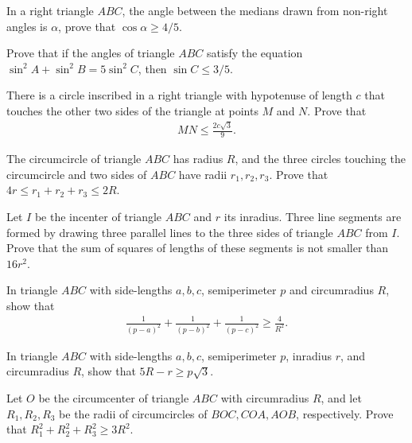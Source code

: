 \begin{question}
    In a right triangle $ABC$, the angle between the medians drawn from non-right angles is $\alpha$, prove that $\cos \alpha \geq 4/5$.
\end{question}


\begin{question}
    Prove that if the angles of triangle $ABC$ satisfy the equation $\sin^2 A + \sin^2 B = 5\sin^2 C$, then $\sin C \leq 3/5$.
\end{question}


\begin{question}
    There is a circle inscribed in a right triangle with hypotenuse of length $c$ that touches the other two sides of the triangle at points $M$ and $N$. Prove that
    \begin{align*}
        MN \leq \frac{2c\sqrt{3}}{9}.
    \end{align*}
\end{question}




\begin{question}
    The circumcircle of triangle $ABC$ has radius $R$, and the three circles touching the circumcircle and two sides of $ABC$ have radii $r_1,r_2,r_3$. Prove that $4r \leq r_1+r_2+r_3\leq 2R$.
\end{question}

\begin{question}
    Let $I$ be the incenter of triangle $ABC$ and $r$ its inradius. Three line segments are formed by drawing three parallel lines to the three sides of triangle $ABC$ from $I$. Prove that the sum of squares of lengths of these segments is not smaller than $16r^2$.
\end{question}

\begin{question}
    In triangle $ABC$ with side-lengths $a,b,c$, semiperimeter $p$ and circumradius $R$, show that
    \begin{align*}
        \frac{1}{(p-a)^2}+\frac{1}{(p-b)^2}+\frac{1}{(p-c)^2} \geq \frac{4}{R^2}.
    \end{align*}
\end{question}


\begin{question}
    In triangle $ABC$ with side-lengths $a,b,c$, semiperimeter $p$, inradius $r$, and circumradius $R$, show that $5R-r \geq p \sqrt{3}$.
\end{question}


\begin{question}
    Let $O$ be the circumcenter of triangle $ABC$ with circumradius $R$, and let $R_1,R_2,R_3$ be the radii of circumcircles of $BOC, COA, AOB$, respectively. Prove that $R_1^2 + R_2^2 + R_3^2 \geq 3R^2$.
\end{question}


